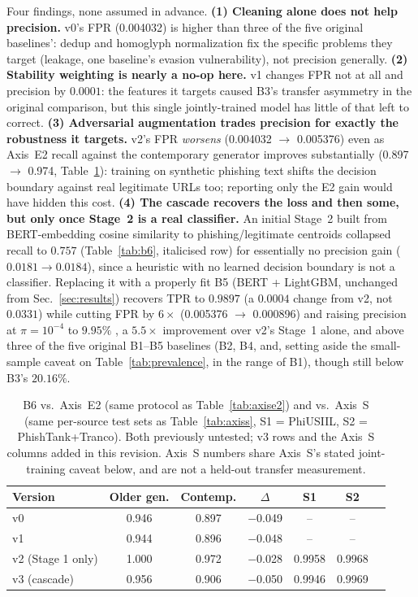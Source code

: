\documentclass[conference]{IEEEtran}
\begin{document}
Four findings, none assumed in advance. \textbf{(1) Cleaning alone does
not help precision.} v0's FPR (0.004032) is higher than three of the five original baselines': dedup and homoglyph
normalization fix the specific problems they target (leakage, one baseline's evasion vulnerability), not
precision generally. \textbf{(2) Stability weighting is nearly a no-op
here.} v1 changes FPR not at all and precision by $0.0001$: the features
it targets caused B3's transfer asymmetry in the original comparison, but
this single jointly-trained model has little of that left to correct.
\textbf{(3) Adversarial augmentation trades precision for exactly the
robustness it targets.} v2's FPR \emph{worsens} (0.004032 $\to$ 0.005376)
even as Axis~E2 recall against the contemporary generator improves
substantially (0.897 $\to$ 0.974, Table~\ref{tab:b6-e2}): training on synthetic phishing
text shifts the decision boundary against real
legitimate URLs too; reporting only the E2 gain would have hidden this
cost. \textbf{(4) The cascade recovers the loss and then some, but only
once Stage~2 is a real classifier.} An initial Stage~2 built from
BERT-embedding cosine similarity to phishing/legitimate centroids collapsed
recall to $0.757$ (Table~\ref{tab:b6}, italicised row) for essentially no precision gain ($0.0181\to0.0184$), since a heuristic
with no learned decision boundary is not a classifier. Replacing it with a properly fit B5
(BERT + LightGBM, unchanged from Sec.~\ref{sec:results}) recovers TPR to
$0.9897$ (a $0.0004$ change from v2, not $0.0331$) while cutting FPR by
$6\times$ (0.005376 $\to$ 0.000896) and raising precision at $\pi=10^{-4}$
to $\mathbf{9.95\%}$ ,  a $5.5\times$ improvement over v2's Stage~1 alone,
and above three of the five original B1--B5 baselines (B2, B4, and,
setting aside the small-sample caveat on Table~\ref{tab:prevalence}, in the
range of B1), though still below B3's $20.16\%$.

\begin{table}[t]
\caption{B6 vs.\ Axis~E2 (same protocol as Table~\ref{tab:axise2}) and
vs.\ Axis~S (same per-source test sets as Table~\ref{tab:axiss}, S1 =
PhiUSIIL, S2 = PhishTank+Tranco). Both previously untested; v3 rows and
the Axis~S columns added in this revision. Axis~S numbers share Axis~S's stated joint-training caveat below, and are
not a held-out transfer measurement.}
\label{tab:b6-e2}
\centering\footnotesize
\setlength{\tabcolsep}{3.5pt}
\begin{tabular}{@{}lcccccc@{}}
\toprule
\textbf{Version} & \textbf{Older gen.} & \textbf{Contemp.} & \textbf{$\Delta$} & \textbf{S1} & \textbf{S2}\\
\midrule
v0 & 0.946 & 0.897 & $-$0.049 & -- & --\\
v1 & 0.944 & 0.896 & $-$0.048 & -- & --\\
v2 (Stage 1 only)   & 1.000 & 0.972 & $-$0.028 & 0.9958 & 0.9968\\
v3 (cascade)        & 0.956 & 0.906 & $-$0.050 & 0.9946 & 0.9969\\
\bottomrule
\end{tabular}
\end{table}
\end{document}
